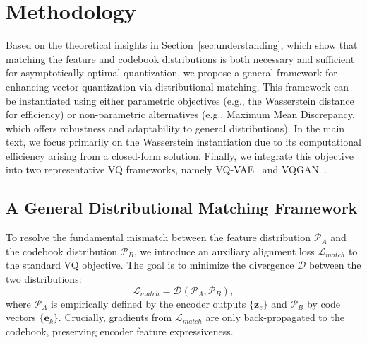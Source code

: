 

\section{Methodology}
\label{sec:method}



Based on the theoretical insights in Section~\ref{sec:understanding}, which show that matching the feature and codebook distributions is both necessary and sufficient for asymptotically optimal quantization, we propose a general framework for enhancing vector quantization via distributional matching. 
This framework can be instantiated using either parametric objectives (e.g., the Wasserstein distance for efficiency) or non-parametric alternatives (e.g., Maximum Mean Discrepancy, which offers robustness and adaptability to general distributions). In the main text, we focus primarily on the Wasserstein instantiation due to its computational efficiency arising from a closed-form solution. Finally, we integrate this objective into two representative VQ frameworks, namely VQ-VAE~\cite{Oord2017NeuralDR} and VQGAN~\cite{Esser2020TamingTF}.

\subsection{A General Distributional Matching Framework}
\label{sec:distributional matching framework}
To resolve the fundamental mismatch between the feature distribution $\mathcal{P}_A$ and the codebook distribution $\mathcal{P}_B$, we introduce an auxiliary alignment loss $\mathcal{L}_{match}$ to the standard VQ objective. The goal is to minimize the divergence $\mathcal{D}$ between the two distributions:
\begin{equation}
    \mathcal{L}_{match} = \mathcal{D}(\mathcal{P}_A, \mathcal{P}_B),
\end{equation}
where $\mathcal{P}_A$ is empirically defined by the encoder outputs $\{\bm{z}_e\}$ and $\mathcal{P}_B$ by code vectors $\{\bm{e}_k\}$. Crucially, gradients from $\mathcal{L}_{match}$ are only back-propagated to the codebook, preserving encoder feature expressiveness. %
\vspace{-2ex}

